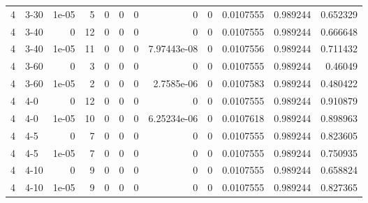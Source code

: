 \begin{tabular}{rlrrrrrrrrrr}
     4 & 3-30   &      1e-05 &           5 &                 0 &                 0 &     0           &     0           &      0           &        0.0107555 &               0.989244 &           0.652329 \\
     4 & 3-40   &      0     &          12 &                 0 &                 0 &     0           &     0           &      0           &        0.0107555 &               0.989244 &           0.666648 \\
     4 & 3-40   &      1e-05 &          11 &                 0 &                 0 &     0           &     7.97443e-08 &      0           &        0.0107556 &               0.989244 &           0.711432 \\
     4 & 3-60   &      0     &           3 &                 0 &                 0 &     0           &     0           &      0           &        0.0107555 &               0.989244 &           0.46049  \\
     4 & 3-60   &      1e-05 &           2 &                 0 &                 0 &     0           &     2.7585e-06  &      0           &        0.0107583 &               0.989244 &           0.480422 \\
     4 & 4-0    &      0     &          12 &                 0 &                 0 &     0           &     0           &      0           &        0.0107555 &               0.989244 &           0.910879 \\
     4 & 4-0    &      1e-05 &          10 &                 0 &                 0 &     0           &     6.25234e-06 &      0           &        0.0107618 &               0.989244 &           0.898963 \\
     4 & 4-5    &      0     &           7 &                 0 &                 0 &     0           &     0           &      0           &        0.0107555 &               0.989244 &           0.823605 \\
     4 & 4-5    &      1e-05 &           7 &                 0 &                 0 &     0           &     0           &      0           &        0.0107555 &               0.989244 &           0.750935 \\
     4 & 4-10   &      0     &           9 &                 0 &                 0 &     0           &     0           &      0           &        0.0107555 &               0.989244 &           0.658824 \\
     4 & 4-10   &      1e-05 &           9 &                 0 &                 0 &     0           &     0           &      0           &        0.0107555 &               0.989244 &           0.827365 \\

\end{tabular}
